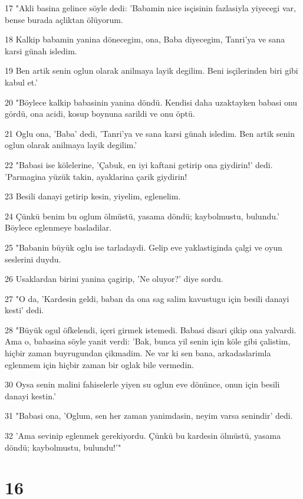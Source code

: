 \par 17 "Akli basina gelince söyle dedi: 'Babamin nice isçisinin fazlasiyla yiyecegi var, bense burada açliktan ölüyorum.
\par 18 Kalkip babamin yanina dönecegim, ona, Baba diyecegim, Tanri'ya ve sana karsi günah isledim.
\par 19 Ben artik senin oglun olarak anilmaya layik degilim. Beni isçilerinden biri gibi kabul et.'
\par 20 "Böylece kalkip babasinin yanina döndü. Kendisi daha uzaktayken babasi onu gördü, ona acidi, kosup boynuna sarildi ve onu öptü.
\par 21 Oglu ona, 'Baba' dedi, 'Tanri'ya ve sana karsi günah isledim. Ben artik senin oglun olarak anilmaya layik degilim.'
\par 22 "Babasi ise kölelerine, 'Çabuk, en iyi kaftani getirip ona giydirin!' dedi. 'Parmagina yüzük takin, ayaklarina çarik giydirin!
\par 23 Besili danayi getirip kesin, yiyelim, eglenelim.
\par 24 Çünkü benim bu oglum ölmüstü, yasama döndü; kaybolmustu, bulundu.' Böylece eglenmeye basladilar.
\par 25 "Babanin büyük oglu ise tarladaydi. Gelip eve yaklastiginda çalgi ve oyun seslerini duydu.
\par 26 Usaklardan birini yanina çagirip, 'Ne oluyor?' diye sordu.
\par 27 "O da, 'Kardesin geldi, baban da ona sag salim kavustugu için besili danayi kesti' dedi.
\par 28 "Büyük ogul öfkelendi, içeri girmek istemedi. Babasi disari çikip ona yalvardi. Ama o, babasina söyle yanit verdi: 'Bak, bunca yil senin için köle gibi çalistim, hiçbir zaman buyrugundan çikmadim. Ne var ki sen bana, arkadaslarimla eglenmem için hiçbir zaman bir oglak bile vermedin.
\par 30 Oysa senin malini fahiselerle yiyen su oglun eve dönünce, onun için besili danayi kestin.'
\par 31 "Babasi ona, 'Oglum, sen her zaman yanimdasin, neyim varsa senindir' dedi.
\par 32 'Ama sevinip eglenmek gerekiyordu. Çünkü bu kardesin ölmüstü, yasama döndü; kaybolmustu, bulundu!'"

\chapter{16}

